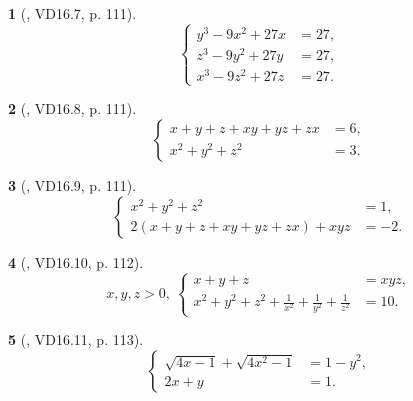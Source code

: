 \documentclass{article}
\newtheorem{baitoan}{}
\begin{document}
\begin{baitoan}[\cite{TLCT_THCS_Toan_9_dai_so}, VD16.7, p. 111]
	\begin{equation*}
		\left\{\begin{split}
			y^3 - 9x^2 + 27x &= 27,\\
			z^3 - 9y^2 + 27y &= 27,\\
			x^3 - 9z^2 + 27z &= 27.
		\end{split}\right.
	\end{equation*}
\end{baitoan}

\begin{baitoan}[\cite{TLCT_THCS_Toan_9_dai_so}, VD16.8, p. 111]
	\begin{equation*}
		\left\{\begin{split}
			x + y + z + xy + yz + zx &= 6,\\
			x^2 + y^2 + z^2 &= 3.
		\end{split}\right.
	\end{equation*}
\end{baitoan}

\begin{baitoan}[\cite{TLCT_THCS_Toan_9_dai_so}, VD16.9, p. 111]
	\begin{equation*}
		\left\{\begin{split}
			x^2 + y^2 + z^2 &= 1,\\
			2(x + y + z + xy + yz + zx) + xyz &= -2.
		\end{split}\right.
	\end{equation*}
\end{baitoan}

\begin{baitoan}[\cite{TLCT_THCS_Toan_9_dai_so}, VD16.10, p. 112]
	\begin{equation*}
		x,y,z > 0,\ \left\{\begin{split}
			x + y + z &= xyz,\\
			x^2 + y^2 + z^2 + \frac{1}{x^2} + \frac{1}{y^2} + \frac{1}{z^2} &= 10.
		\end{split}\right.
	\end{equation*}
\end{baitoan}

\begin{baitoan}[\cite{TLCT_THCS_Toan_9_dai_so}, VD16.11, p. 113]
	\begin{equation*}
		\left\{\begin{split}
			\sqrt{4x - 1} + \sqrt{4x^2 - 1} &= 1 - y^2,\\
			2x + y &= 1.
		\end{split}\right.
	\end{equation*}
\end{baitoan}
\end{document}
